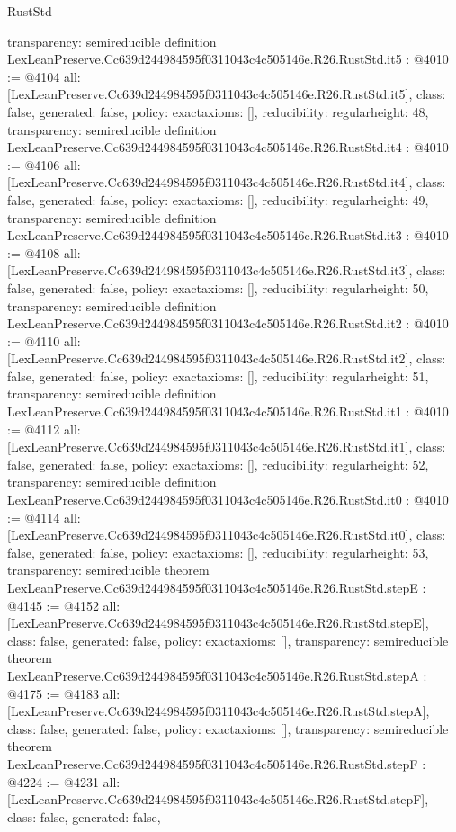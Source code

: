 \begin{lexlean}{RustStd}
\begin{coremodule}
{  transparency: semireducible
}
definition LexLeanPreserve.Cc639d244984595f0311043c4c505146e.R26.RustStd.it5 : @4010 := @4104 {
  all: [LexLeanPreserve.Cc639d244984595f0311043c4c505146e.R26.RustStd.it5],
  class: false,
  generated: false,
  policy: exact{axioms: []},
  reducibility: regular{height: 48},
  transparency: semireducible
}
definition LexLeanPreserve.Cc639d244984595f0311043c4c505146e.R26.RustStd.it4 : @4010 := @4106 {
  all: [LexLeanPreserve.Cc639d244984595f0311043c4c505146e.R26.RustStd.it4],
  class: false,
  generated: false,
  policy: exact{axioms: []},
  reducibility: regular{height: 49},
  transparency: semireducible
}
definition LexLeanPreserve.Cc639d244984595f0311043c4c505146e.R26.RustStd.it3 : @4010 := @4108 {
  all: [LexLeanPreserve.Cc639d244984595f0311043c4c505146e.R26.RustStd.it3],
  class: false,
  generated: false,
  policy: exact{axioms: []},
  reducibility: regular{height: 50},
  transparency: semireducible
}
definition LexLeanPreserve.Cc639d244984595f0311043c4c505146e.R26.RustStd.it2 : @4010 := @4110 {
  all: [LexLeanPreserve.Cc639d244984595f0311043c4c505146e.R26.RustStd.it2],
  class: false,
  generated: false,
  policy: exact{axioms: []},
  reducibility: regular{height: 51},
  transparency: semireducible
}
definition LexLeanPreserve.Cc639d244984595f0311043c4c505146e.R26.RustStd.it1 : @4010 := @4112 {
  all: [LexLeanPreserve.Cc639d244984595f0311043c4c505146e.R26.RustStd.it1],
  class: false,
  generated: false,
  policy: exact{axioms: []},
  reducibility: regular{height: 52},
  transparency: semireducible
}
definition LexLeanPreserve.Cc639d244984595f0311043c4c505146e.R26.RustStd.it0 : @4010 := @4114 {
  all: [LexLeanPreserve.Cc639d244984595f0311043c4c505146e.R26.RustStd.it0],
  class: false,
  generated: false,
  policy: exact{axioms: []},
  reducibility: regular{height: 53},
  transparency: semireducible
}
theorem LexLeanPreserve.Cc639d244984595f0311043c4c505146e.R26.RustStd.stepE : @4145 := @4152 {
  all: [LexLeanPreserve.Cc639d244984595f0311043c4c505146e.R26.RustStd.stepE],
  class: false,
  generated: false,
  policy: exact{axioms: []},
  transparency: semireducible
}
theorem LexLeanPreserve.Cc639d244984595f0311043c4c505146e.R26.RustStd.stepA : @4175 := @4183 {
  all: [LexLeanPreserve.Cc639d244984595f0311043c4c505146e.R26.RustStd.stepA],
  class: false,
  generated: false,
  policy: exact{axioms: []},
  transparency: semireducible
}
theorem LexLeanPreserve.Cc639d244984595f0311043c4c505146e.R26.RustStd.stepF : @4224 := @4231 {
  all: [LexLeanPreserve.Cc639d244984595f0311043c4c505146e.R26.RustStd.stepF],
  class: false,
  generated: false,
}
\end{coremodule}
\end{lexlean}
